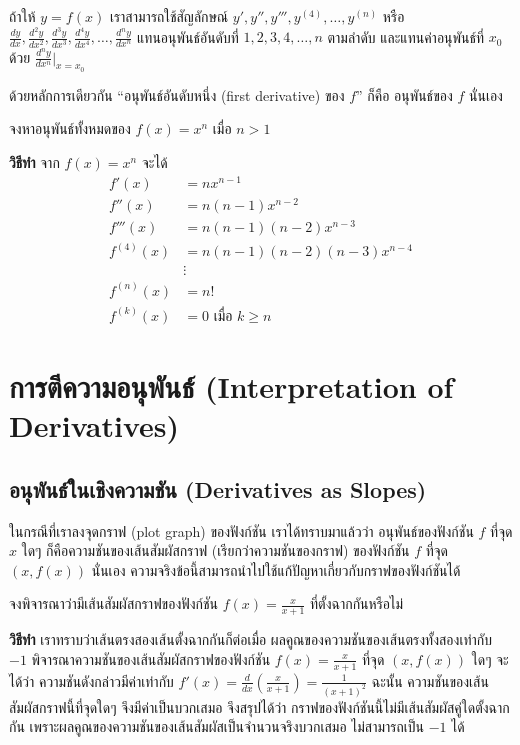 \documentclass[
]{book}
\begin{document}
ถ้าให้ \(y= f(x)\) เราสามารถใช้สัญลักษณ์
\(y', y'', y''', y^{(4)}, \ldots, y^{(n)}\) หรือ
\(\frac{dy}{dx}, \frac{d^2y}{dx^2}, \frac{d^3y}{dx^3}, \frac{d^4y}{dx^4}, \ldots,
\frac{d^ny}{dx^n}\) แทนอนุพันธ์อันดับที่ \(1,2,3,4,\ldots,n\) ตามลำดับ
และแทนค่าอนุพันธ์ที่ \(x_0\) ด้วย \(\frac{d^ny}{dx^n}|_{x=x_0}\)

ด้วยหลักการเดียวกัน ``อนุพันธ์อันดับหนึ่ง (first derivative) ของ \(f\)'' ก็คือ
อนุพันธ์ของ \(f\) นั่นเอง

จงหาอนุพันธ์ทั้งหมดของ \(f(x) = x^n\) เมื่อ \(n > 1\)

\textbf{วิธีทำ} จาก \(f(x) = x^n\) จะได้ \begin{equation}   \begin{aligned}
        f'(x) &= n x^{n-1} \\
        f''(x) &= n(n-1) x^{n-2} \\
        f'''(x) &= n(n-1)(n-2) x^{n-3} \\
        f^{(4)}(x) &= n(n-1)(n-2)(n-3) x^{n-4} \\
          &\vdots \\
        f^{(n)}(x) &= n! \\
        f^{(k)}(x) &= 0 \text{ เมื่อ } k \ge n
  \end{aligned} \end{equation}

\section{การตีความอนุพันธ์ (Interpretation of
Derivatives)}\label{uxe01uxe32uxe23uxe15uxe04uxe27uxe32uxe21uxe2duxe19uxe1euxe19uxe18-interpretation-of-derivatives}

\subsection{อนุพันธ์ในเชิงความชัน (Derivatives as
Slopes)}\label{uxe2duxe19uxe1euxe19uxe18uxe43uxe19uxe40uxe0auxe07uxe04uxe27uxe32uxe21uxe0auxe19-derivatives-as-slopes}

ในกรณีที่เราลงจุดกราฟ (plot graph) ของฟังก์ชัน เราได้ทราบมาแล้วว่า อนุพันธ์ของฟังก์ชัน
\(f\) ที่จุด \(x\) ใดๆ ก็คือความชันของเส้นสัมผัสกราฟ (เรียกว่าความชันของกราฟ)
ของฟังก์ชัน \(f\) ที่จุด \((x,f(x))\) นั่นเอง
ความจริงข้อนี้สามารถนำไปใช้แก้ปัญหาเกี่ยวกับกราฟของฟังก์ชันได้

จงพิจารณาว่ามีเส้นสัมผัสกราฟของฟังก์ชัน \(\displaystyle f(x)=\frac{x}{x+1}\)
ที่ตั้งฉากกันหรือไม่

\textbf{วิธีทำ} เราทราบว่าเส้นตรงสองเส้นตั้งฉากกันก็ต่อเมื่อ
ผลคูณของความชันของเส้นตรงทั้งสองเท่ากับ \(-1\)
พิจารณาความชันของเส้นสัมผัสกราฟของฟังก์ชัน \(\displaystyle f(x)=\frac{x}{x+1}\)
ที่จุด \((x,f(x))\) ใดๆ จะได้ว่า ความชันดังกล่าวมีค่าเท่ากับ
\(\displaystyle f'(x)=\frac{d}{dx}\left(\frac{x}{x+1}\right)=\frac{1}{(x+1)^2}\)
ฉะนั้น ความชันของเส้นสัมผัสกราฟนี้ที่จุดใดๆ จึงมีค่าเป็นบวกเสมอ จึงสรุปได้ว่า
กราฟของฟังก์ชันนี้ไม่มีเส้นสัมผัสคู่ใดตั้งฉากกัน
เพราะผลคูณของความชันของเส้นสัมผัสเป็นจำนวนจริงบวกเสมอ ไม่สามารถเป็น \(-1\) ได้
\end{document}
